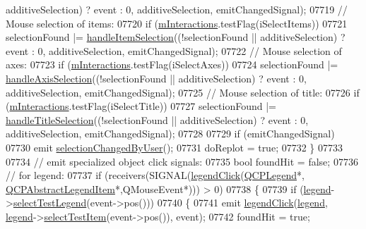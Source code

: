 \begin{DoxyCode}
      additiveSelection) ? \textcolor{keyword}{event} : 0, additiveSelection, emitChangedSignal);
07719       \textcolor{comment}{// Mouse selection of items:}
07720       \textcolor{keywordflow}{if} (\hyperlink{a00116_af8d040767753acc548b2368dd4150ae6}{mInteractions}.testFlag(iSelectItems))
07721         selectionFound |= \hyperlink{a00116_aa1ad9839539b4cdf9f7da768336650f2}{handleItemSelection}((!selectionFound || additiveSelection) ? \textcolor{keyword}{
      event} : 0, additiveSelection, emitChangedSignal);
07722       \textcolor{comment}{// Mouse selection of axes:}
07723       \textcolor{keywordflow}{if} (\hyperlink{a00116_af8d040767753acc548b2368dd4150ae6}{mInteractions}.testFlag(iSelectAxes))
07724         selectionFound |= \hyperlink{a00116_a6085478fe8ba07b2a192cf8217133cb3}{handleAxisSelection}((!selectionFound || additiveSelection) ? \textcolor{keyword}{
      event} : 0, additiveSelection, emitChangedSignal);
07725       \textcolor{comment}{// Mouse selection of title:}
07726       \textcolor{keywordflow}{if} (\hyperlink{a00116_af8d040767753acc548b2368dd4150ae6}{mInteractions}.testFlag(iSelectTitle))
07727         selectionFound |= \hyperlink{a00116_ae688ab743e775cd0c69941a082dd32e3}{handleTitleSelection}((!selectionFound || additiveSelection) ?
       \textcolor{keyword}{event} : 0, additiveSelection, emitChangedSignal);
07728       
07729       \textcolor{keywordflow}{if} (emitChangedSignal)
07730         emit \hyperlink{a00116_a500c64a109bc773c973ad274f2fa4190}{selectionChangedByUser}();
07731       doReplot = \textcolor{keyword}{true};
07732     \}
07733     
07734     \textcolor{comment}{// emit specialized object click signals:}
07735     \textcolor{keywordtype}{bool} foundHit = \textcolor{keyword}{false};
07736     \textcolor{comment}{// for legend:}
07737     \textcolor{keywordflow}{if} (receivers(SIGNAL(\hyperlink{a00116_a79cff0baafbca10a3aaf694d2d3b9ab3}{legendClick}(\hyperlink{a00045}{QCPLegend}*,
      \hyperlink{a00023}{QCPAbstractLegendItem}*,QMouseEvent*))) > 0)
07738     \{
07739       \textcolor{keywordflow}{if} (\hyperlink{a00116_a75acd427ec48e9a9d2ae6a17817cc490}{legend}->\hyperlink{a00045_a6388446e0906b21ebf3a92310570e73e}{selectTestLegend}(event->pos()))
07740       \{
07741         emit \hyperlink{a00116_a79cff0baafbca10a3aaf694d2d3b9ab3}{legendClick}(\hyperlink{a00116_a75acd427ec48e9a9d2ae6a17817cc490}{legend}, \hyperlink{a00116_a75acd427ec48e9a9d2ae6a17817cc490}{legend}->\hyperlink{a00045_a8bbb0b003cc93f07dff1d69416b606f0}{selectTestItem}(event->pos()),
       event);
07742         foundHit = \textcolor{keyword}{true};

\end{DoxyCode}
